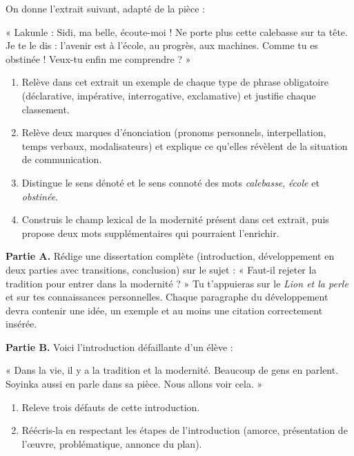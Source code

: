 \documentclass[11pt]{article}
\begin{document}
\begin{exercice}
On donne l'extrait suivant, adapté de la pièce :

« Lakunle : Sidi, ma belle, écoute-moi ! Ne porte plus cette calebasse sur ta tête. Je te le dis : l'avenir est à l'école, au progrès, aux machines. Comme tu es obstinée ! Veux-tu enfin me comprendre ? »

\begin{enumerate}
\item Relève dans cet extrait un exemple de chaque type de phrase obligatoire (déclarative, impérative, interrogative, exclamative) et justifie chaque classement.
\item Relève deux marques d'énonciation (pronoms personnels, interpellation, temps verbaux, modalisateurs) et explique ce qu'elles révèlent de la situation de communication.
\item Distingue le sens dénoté et le sens connoté des mots \emph{calebasse}, \emph{école} et \emph{obstinée}.
\item Construis le champ lexical de la modernité présent dans cet extrait, puis propose deux mots supplémentaires qui pourraient l'enrichir.
\end{enumerate}
\end{exercice}

\begin{exercice}
\textbf{Partie A.} Rédige une dissertation complète (introduction, développement en deux parties avec transitions, conclusion) sur le sujet : « Faut-il rejeter la tradition pour entrer dans la modernité ? » Tu t'appuieras sur le \emph{Lion et la perle} et sur tes connaissances personnelles. Chaque paragraphe du développement devra contenir une idée, un exemple et au moins une citation correctement insérée.

\textbf{Partie B.} Voici l'introduction défaillante d'un élève :

« Dans la vie, il y a la tradition et la modernité. Beaucoup de gens en parlent. Soyinka aussi en parle dans sa pièce. Nous allons voir cela. »

\begin{enumerate}
\item Releve trois défauts de cette introduction.
\item Réécris-la en respectant les étapes de l'introduction (amorce, présentation de l'œuvre, problématique, annonce du plan).
\end{enumerate}
\end{exercice}
\end{document}
